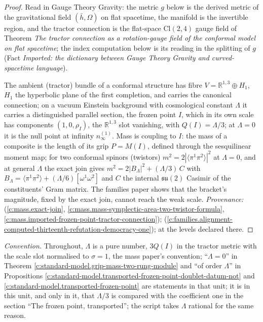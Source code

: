 \documentclass[11pt]{article}
\theoremstyle{definition}
\theoremstyle{plain}
\providecommand{\Cl}{}\renewcommand{\Cl}{\mathrm{Cl}}
\providecommand{\R}{}\renewcommand{\R}{\mathbb{R}}
\providecommand{\hb}{}\renewcommand{\hb}{\bar{h}}
\providecommand{\nInf}{}\renewcommand{\nInf}{n_\infty}
\providecommand{\br}{}\renewcommand{\br}[1]{\langle #1\rangle}
\begin{document}
\begin{proof}
Read in Gauge Theory Gravity: the metric $g$ below is the derived metric of the gravitational field $(\hb, \Omega)$ on flat spacetime, the manifold is the invertible region, and the tractor connection is the flat-space $\Cl(2,4)$ gauge field of Theorem \emph{The tractor connection as a rotation-gauge field of the conformal model on flat spacetime}; the index computation below is its reading in the splitting of $g$ (Fact \emph{Imported: the dictionary between Gauge Theory Gravity and curved-spacetime language}).

The ambient (tractor) bundle of a conformal structure has fibre $V = \R^{1,3} \oplus H_{1}$, $H_{1}$ the hyperbolic plane of the first completion, and carries the canonical connection; on a vacuum Einstein background with cosmological constant $\Lambda$ it carries a distinguished parallel section, the frozen point $I$, which in its own scale has components $(1, 0, \rho_{I})$, the $\R^{1,3}$ slot vanishing, with $Q(I) = \Lambda/3$; at $\Lambda = 0$ it is the null point at infinity $\nInf^{(1)}$. Mass is coupling to $I$: the mass of a composite is the length of its grip $P = M(I)$, defined through the sesquilinear moment map; for two conformal spinors (twistors) $m^{2} = 2|\br{\pi^{1}\pi^{2}}|^{2}$ at $\Lambda = 0$, and at general $\Lambda$ the exact join gives $m^{2} = 2|B_{\Lambda}|^{2} + (\Lambda/3)\,C$ with $B_{\Lambda} = \br{\pi^{1}\pi^{2}} + (\Lambda/6)[\omega^{1}\omega^{2}]$ and $C$ the internal $\mathfrak{su}(2)$ Casimir of the constituents' Gram matrix. The families paper shows that the bracket's magnitude, fixed by the exact join, cannot reach the weak scale. \emph{Provenance:} \cite[Fact~2.1, Def.~5.4, Prop.~4.1, Thm.~5.6]{ButlerT11} (\ref{c:mass.exact-join}, \ref{c:mass.mass-symplectic-area-two-twistor-formula}, \ref{c:mass.imported-frozen-point-tractor-connection}); \cite[Prop.~4.3]{ButlerT13} (\ref{c:families.alignment-computed-thirteenth-refutation-democracy-one}); at the levels declared there.

\end{proof}

\label{c:note.standard-model.setting-modules-mass-mechanism-rung-doublet-2}
\emph{Convention.} Throughout, $\Lambda$ is a pure number, $3Q(I)$ in the tractor metric with the scale slot normalised to $\sigma = 1$, the mass paper's convention; ``$\Lambda = 0$'' in Theorem \ref{c:standard-model.grip-mass-two-rung-module} and ``of order $\Lambda$'' in Propositions \ref{c:standard-model.transported-frozen-point-doublet-datum-not} and \ref{c:standard-model.transported-frozen-point} are statements in that unit; it is in this unit, and only in it, that $\Lambda/3$ is compared with the coefficient one in the section ``The frozen point, transported''; the script takes $\Lambda$ rational for the same reason.
\end{document}
